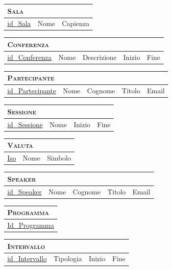 	\begin{tabular}{|l|l|l|}
		\multicolumn{3}{l}{\textsc{Sala}} \\ \hline
		\underline{id\_Sala} & Nome & Capienza \\ \hline
	\end{tabular}


	\begin{tabular}{|l|l|l|l|l|}
		\multicolumn{5}{l}{\textsc{Conferenza}} \\ \hline
		\underline{id\_Conferenza} & Nome & Descrizione & Inizio & Fine \\ \hline
	\end{tabular}


	\begin{tabular}{|l|l|l|l|l|}
		\multicolumn{5}{l}{\textsc{Partecipante}} \\ \hline
		\underline{id\_Partecipante} & Nome & Cognome & Titolo & Email \\ \hline
	\end{tabular}


	\begin{tabular}{|l|l|l|l|}
		\multicolumn{4}{l}{\textsc{Sessione}} \\ \hline
		\underline{id\_Sessione} & Nome & Inizio & Fine \\ \hline
	\end{tabular}


	\begin{tabular}{|l|l|l|}
		\multicolumn{3}{l}{\textsc{Valuta}} \\ \hline
		\underline{Iso} & Nome & Simbolo \\ \hline
	\end{tabular}


	\begin{tabular}{|l|l|l|l|l|}
		\multicolumn{5}{l}{\textsc{Speaker}} \\ \hline
		\underline{id\_Speaker} & Nome & Cognome & Titolo & Email \\ \hline
	\end{tabular}


	\begin{tabular}{|l|}
		\multicolumn{1}{l}{\textsc{Programma}} \\ \hline
		\underline{Id\_Programma} \\ \hline
	\end{tabular}


	\begin{tabular}{|l|l|l|l|}
		\multicolumn{4}{l}{\textsc{Intervallo}} \\ \hline
		\underline{id\_Intervallo} & Tipologia & Inizio & Fine \\ \hline
	\end{tabular}


